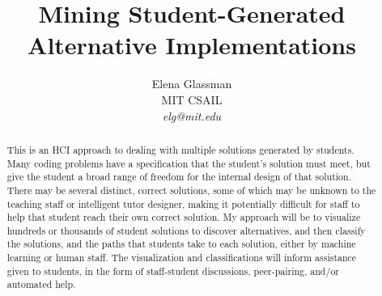 \documentclass[12pt]{article}
\begin{document}
\title{Mining Student-Generated Alternative Implementations}

\author{Elena Glassman \\ MIT CSAIL \\ \textit{elg@mit.edu}
}

\maketitle

\begin{abstract}
This is an HCI approach to dealing with multiple solutions generated by students. Many coding problems have a specification that the student's solution must meet, but give the student a broad range of freedom for the internal design of that solution. There may be several distinct, correct solutions, some of which may be unknown to the teaching staff or intelligent tutor designer, making it potentially difficult for staff to help that student reach their own correct solution. My approach will be to visualize hundreds or thousands of student solutions to discover alternatives, and then classify the solutions, and the paths that students take to each solution, either by machine learning or human staff. The visualization and classifications will inform assistance given to students, in the form of staff-student discussions, peer-pairing, and/or automated help.

\end{abstract}
\end{document}
